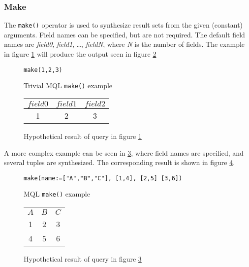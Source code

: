 \subsubsection{Make}
The \texttt{make()} operator is used to synthesize result sets from the given
(constant) arguments. Field names can be specified, but are not required. The
default field names are \textit{field0}, \textit{field1}, \ldots,
\textit{fieldN}, where \textit{N} is the number of fields. The example in
figure \ref{figure:mql:make_example1} will produce the output seen in figure
\ref{figure:mql:make_example1_result}

\begin{figure}[!h]
\centering
\begin{Verbatim}
make(1,2,3)
\end{Verbatim}
\caption{Trivial MQL \texttt{make()} example}
\label{figure:mql:make_example1}
\end{figure}

\begin{figure}[!h]
\centering
\begin{tabular}{|c | c | c |}
\hline
$field0$ & $field1$ & $field2$ \\ \hline
1 & 2 & 3 \\ \hline
\end{tabular}
\caption{Hypothetical result of query in figure
\ref{figure:mql:make_example1}}
\label{figure:mql:make_example1_result}
\end{figure}

A more complex example can be seen in \ref{figure:mql:make_example2}, where
field names are specified, and several tuples are synthesized. The
corresponding result is shown in figure \ref{figure:mql:make_example2_result}.

\begin{figure}[!h]
\centering
\begin{Verbatim}
make(name:=["A","B","C"], [1,4], [2,5] [3,6])
\end{Verbatim}
\caption{MQL \texttt{make()} example}
\label{figure:mql:make_example2}
\end{figure}

\begin{figure}[!h]
\centering
\begin{tabular}{|c | c | c |}
\hline
$A$ & $B$ & $C$ \\ \hline
1 & 2 & 3 \\ \hline
4 & 5 & 6 \\ \hline
\end{tabular}
\caption{Hypothetical result of query in figure
\ref{figure:mql:make_example2}}
\label{figure:mql:make_example2_result}
\end{figure}

